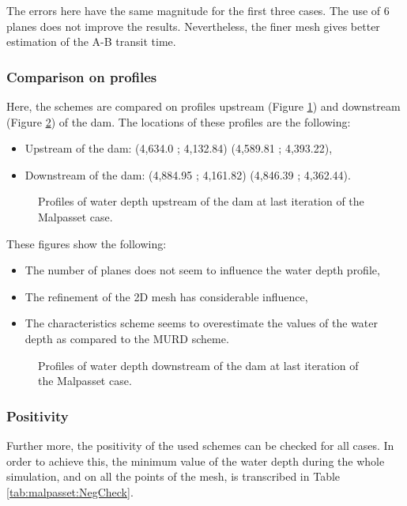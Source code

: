 The errors here have the same magnitude for the first three cases. The use of 6 planes does not improve the results. Nevertheless, the finer mesh gives better estimation of the A-B transit time.


\subsubsection*{Comparison on profiles}
Here, the schemes are compared on profiles upstream (Figure \ref{fig:malpasset:upstreamProfile}) and downstream (Figure \ref{fig:malpasset:downstreamProfile}) of the dam. The locations of these profiles are the following:
\begin{itemize}
\itemsep0em
\item Upstream of the dam: (4,634.0 ; 4,132.84) (4,589.81 ; 4,393.22),
\item Downstream of the dam: (4,884.95 ; 4,161.82) (4,846.39 ; 4,362.44).
\end{itemize}

\begin{figure}[H]
  \centering
  \caption{Profiles of water depth upstream of the dam at last iteration of the Malpasset case.}\label{fig:malpasset:upstreamProfile}
\end{figure}
These figures show the following:
\begin{itemize}
\itemsep0em
\item The number of planes does not seem to influence the water depth profile,
\item The refinement of the 2D mesh has considerable influence,
\item The characteristics scheme seems to overestimate the values of the water depth as compared to the MURD scheme.
\end{itemize}
\begin{figure}[H]
  \centering
  \caption{Profiles of water depth downstream of the dam at last iteration of the Malpasset case.}\label{fig:malpasset:downstreamProfile}
\end{figure}

\subsubsection*{Positivity}
Further more, the positivity of the used schemes can be checked for all cases. In order to achieve this, the minimum value of the water depth during the whole simulation, and on all the points of the mesh, is transcribed in Table \ref{tab:malpasset:NegCheck}.

